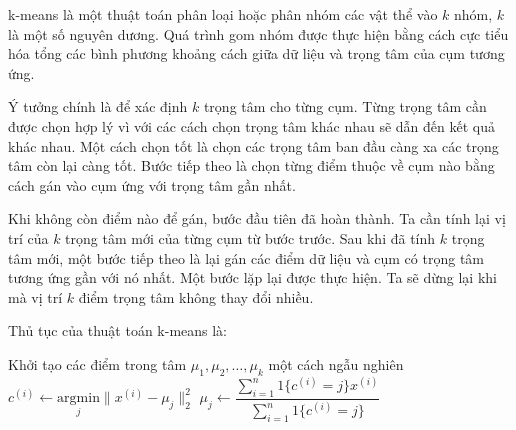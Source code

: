 \documentclass[14pt, a4paper]{article}
\numberwithin{equation}{section}
\numberwithin{figure}{section}
\numberwithin{dl}{section}
\numberwithin{md}{section}
\numberwithin{bd}{section}
\numberwithin{dn}{section}
\numberwithin{hq}{section}
\begin{document}
    k-means là một thuật toán phân loại hoặc phân nhóm các vật thể vào $k$ nhóm, $k$ là một số nguyên dương.
    Quá trình gom nhóm được thực hiện bằng cách cực tiểu hóa tổng các bình phương khoảng cách giữa dữ liệu và trọng tâm của cụm tương ứng.

    Ý tưởng chính là để xác định $k$ trọng tâm cho từng cụm. Từng trọng tâm cần được chọn hợp lý vì với các cách chọn trọng tâm khác nhau sẽ dẫn đến kết quả khác nhau.
    Một cách chọn tốt là chọn các trọng tâm ban đầu càng xa các trọng tâm còn lại càng tốt.
    Bước tiếp theo là chọn từng điểm thuộc về cụm nào bằng cách gán vào cụm ứng với trọng tâm gần nhất.
    
    Khi không còn điểm nào để gán, bước đầu tiên đã hoàn thành.
    Ta cần tính lại vị trí của $k$ trọng tâm mới của từng cụm từ bước trước.
    Sau khi đã tính $k$ trọng tâm mới, một bước tiếp theo là lại gán các điểm dữ liệu và cụm có trọng tâm tương ứng gần với nó nhất.
    Một bước lặp lại được thực hiện. Ta sẽ dừng lại khi mà vị trí $k$ điểm trọng tâm không thay đổi nhiều.

    Thủ tục của thuật toán k-means là:

    \begin{algorithm}[h!]
        \DontPrintSemicolon
        Khởi tạo các điểm trong tâm $\mu_1, \mu_2, \dots, \mu_k$ một cách ngẫu nghiên\;
         {
             {
                $c^{(i)} \gets \underset{j}{\mathrm{argmin}} \lVert x^{(i)} - \mu_j \rVert_2^2$\;
            }
             {
                $\mu_j \gets \dfrac{\sum_{i=1}^n 1\lbrace c^{(i)} = j \rbrace x^{(i)}}{\sum_{i=1}^n 1\lbrace c^{(i)} = j \rbrace}$\;
            }
        }
        \;
    \end{algorithm}

    \newpage
    \printbibliography[title={TÀI LIỆU THAM KHẢO}]
\end{document}
